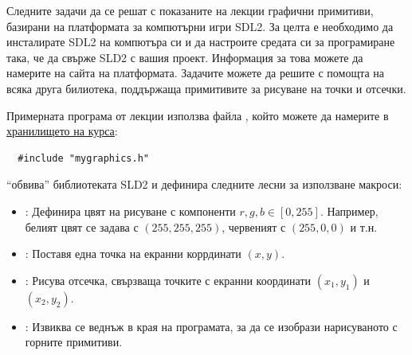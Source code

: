 {  \begin{mdframed}[hidealllines=true,backgroundcolor=gray!20]

  Следните задачи да се решат с показаните на лекции графични примитиви, базирани на платформата за компютърни игри SDL2. За целта е необходимо да инсталирате SDL2 на компютъра си и да настроите средата си за програмиране така, че да свърже SLD2 с вашия проект. Информация за това можете да намерите на сайта на платформата.
	Задачите можете да решите с помощта на всяка друга билиотека, поддържаща примитивите за рисуване на точки и отсечки.

  Примерната програма от лекции използва файла , който можете да намерите в \href{https://github.com/stranxter/lecture-notes/tree/master/samples/01_programming%20101/2018/pixels}{\underline{хранилището на курса}}:
  \begin{mdframed}[hidealllines=true,backgroundcolor=lightgray!20]
  \begin{verbatim}
  #include "mygraphics.h"
  \end{verbatim}
  \end{mdframed}

   ``обвива'' библиотеката SLD2 и дефинира следните лесни за използване макроси:

  \begin{itemize}
    \item {}: Дефинира цвят на рисуване с компоненти $r,g,b\in[0,255]$. Например, белият цвят се задава с $(255,255,255)$, червеният с $(255,0,0)$ и т.н.
    \item {}: Поставя една точка на екранни коррдинати $(x,y)$.
    \item {}: Рисува отсечка, свързваща точките с екранни координати $(x_1,y_1)$ и $(x_2,y_2)$.
    \item {}: Извиква се веднъж в края на програмата, за да се изобрази нарисуваното с горните примитиви.
  \end{itemize}
\end{mdframed}

}

